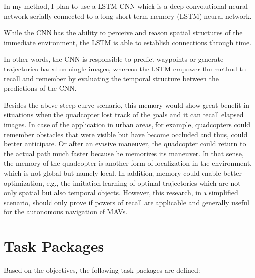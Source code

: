In my method, I plan to use a LSTM-CNN which is a deep convolutional neural network
serially connected to a long-short-term-memory (LSTM) neural network.

While the CNN has the ability to perceive and reason spatial structures of the immediate environment,
the LSTM is able to establish connections through time. 

In other words, the CNN is responsible to predict waypoints 
or generate trajectories based on single images,
whereas the LSTM empower the method to recall and remember 
by evaluating the temporal structure between the predictions of the CNN.

Besides the above steep curve scenario, this memory would show great benefit in situations
when the quadcopter lost track of the goals and it can recall elapsed images.
In case of the application in urban areas, for example, 
quadcopters could remember obstacles 
that were visible but have become occluded and thus, could better anticipate. 
Or after an evasive maneuver, 
the quadcopter could return to the actual path 
much faster because he memorizes its maneuver.
In that sense, the memory of the quadcopter is another form of localization in the environment, 
which is not global but namely local.
In addition, memory could enable better optimization, e.g., 
the imitation learning of optimal trajectories which
are not only spatial but also temporal objects.
However, this research, in a simplified scenario, should only prove if powers of recall 
are applicable and generally useful for the autonomous navigation of MAVs.

\chapter{Task Packages}
Based on the objectives, the following task packages are defined:

